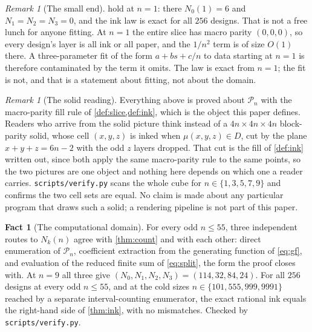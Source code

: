 \documentclass[11pt]{amsart}
\theoremstyle{definition}
\newtheorem{fact}[theorem]{Fact}
\theoremstyle{remark}
\newtheorem{remark}[theorem]{Remark}
\begin{document}
\begin{remark}[The small end]
\label{rem:small}
 hold at $n = 1$: there $N_0(1) = 6$ and $N_1 = N_2 = N_3 = 0$, and the ink law is exact for all $256$ designs. That is not a free lunch for anyone fitting. At $n=1$ the entire slice has macro parity $(0,0,0)$, so every design's layer is all ink or all paper, and the $1/n^2$ term is of size $O(1)$ there. A three-parameter fit of the form $a + bs + c/n$ to data starting at $n=1$ is therefore contaminated by the term it omits. The law is exact from $n=1$; the fit is not, and that is a statement about fitting, not about the domain.
\end{remark}

\begin{remark}[The solid reading]
\label{rem:cut}
Everything above is proved about $\mathcal{P}_n$ with the macro-parity fill rule of \cref{def:slice,def:ink}, which is the object this paper defines. Readers who arrive from the solid picture think instead of a $4n \times 4n \times 4n$ block-parity solid, whose cell $(x,y,z)$ is inked when $\mu(x,y,z) \in D$, cut by the plane $x+y+z = 6n-2$ with the odd $z$ layers dropped. That cut is the fill of \cref{def:ink} written out, since both apply the same macro-parity rule to the same points, so the two pictures are one object and nothing here depends on which one a reader carries. \texttt{scripts/verify.py} scans the whole cube for $n \in \{1,3,5,7,9\}$ and confirms the two cell sets are equal. No claim is made about any particular program that draws such a solid; a rendering pipeline is not part of this paper.
\end{remark}

\begin{fact}[The computational domain]
\label{fact:domain}
For every odd $n \le 55$, three independent routes to $N_k(n)$ agree with \cref{thm:count} and with each other: direct enumeration of $\mathcal{P}_n$, coefficient extraction from the generating function of \cref{eq:gf}, and evaluation of the reduced finite sum of \cref{eq:split}, the form the proof closes with. At $n = 9$ all three give $(N_0,N_1,N_2,N_3) = (114, 32, 84, 24)$. For all $256$ designs at every odd $n \le 55$, and at the cold sizes $n \in \{101, 555, 999, 9991\}$ reached by a separate interval-counting enumerator, the exact rational ink equals the right-hand side of \cref{thm:ink}, with no mismatches. Checked by \texttt{scripts/verify.py}.
\end{fact}
\end{document}
